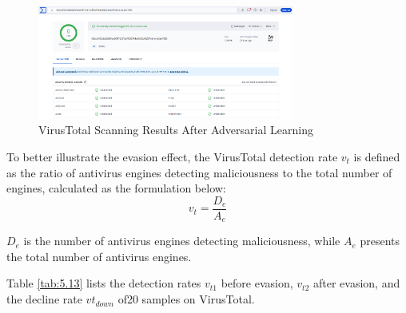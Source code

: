 \begin{figure}[htbp]
	\centering
	\includegraphics[width=0.75\textwidth]{figures/5.3}
	\caption{VirusTotal Scanning Results After Adversarial Learning}\label{fig:5.3}
\end{figure}


To better illustrate the evasion effect, the VirusTotal detection rate $v_t$ is defined as the ratio of antivirus engines detecting maliciousness to the total number of engines, calculated as the formulation below:
\begin{equation}
v_t = \frac{D_e}{A_e}
\tag{5.9}
\end{equation}

$D_e$ is the number of antivirus engines detecting maliciousness, while $A_e$ presents the total number of antivirus engines.

Table \ref{tab:5.13} lists the detection rates $v_{t1}$ before evasion, $v_{t2}$ after evasion, and the decline rate $vt_{down}$ of20 samples on VirusTotal.

